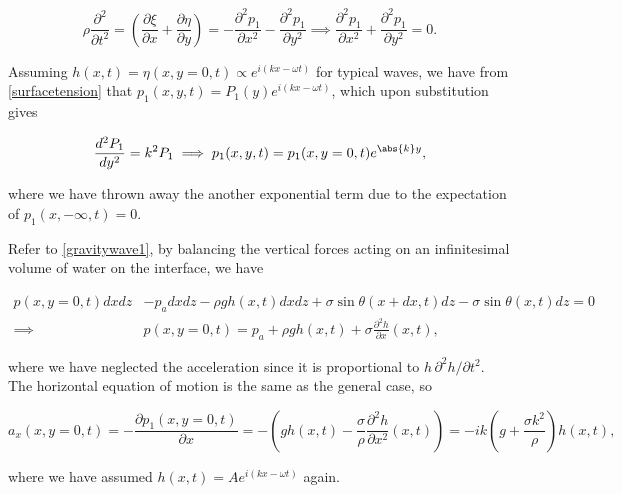 \documentclass[a4paper,12pt]{report}
\begin{document}
\begin{equation}
	\rho \frac{\partial^2 }{\partial t^2} = \left( \frac{\partial \xi }{\partial x} + \frac{\partial \eta }{\partial y}  \right) = - \frac{\partial^2 p_1 }{\partial x^2} - \frac{\partial^2 p_1 }{\partial y^2} \implies \frac{\partial^2 p_{1} }{\partial x^2} + \frac{\partial^2 p_1 }{\partial y^2} = 0.   
\end{equation}

Assuming \(h(x,t) = \eta (x,y=0,t) \propto e^{i(kx-\omega t)} \) for typical waves, we have from \cref{surfacetension} that \(p_1 (x,y,t) = P_1 (y) e^{i(kx- \omega t)} \), which upon substitution gives

\begin{equation}
	\frac{d^2P_1 }{dy^2} = k^2P_1 \implies p_1 (x,y,t) = p_1 (x,y=0,t)e^{\abs{k} y},  
\end{equation}

where we have thrown away the another exponential term due to the expectation of \(p_1 (x,-\infty,t) = 0\). 



Refer to \cref{gravitywave1}, by balancing the vertical forces acting on an infinitesimal volume of water on the interface, we have


\begin{equation} \label{surfacetension} 
	\begin{aligned} 
	p(x,y=0,t) dxdz &- p_{a} dxdz - \rho g h(x,t) dxdz + \sigma \sin \theta (x+dx,t)dz - \sigma \sin \theta (x,t)dz = 0 \\
	\implies &p(x,y=0,t) = p_{a} + \rho g h(x,t) + \sigma \frac{\partial^2 h}{\partial x} (x,t),
	\end{aligned} 
\end{equation}

where we have neglected the acceleration since it is proportional to \(h\,\partial ^2h/\partial t^2\). The horizontal equation of motion is the same as the general case, so

\begin{equation}
	a_{x}(x,y=0,t) = -\frac{\partial p_1 (x,y=0,t)}{\partial x} =- \left( gh(x,t) - \frac{\sigma }{\rho } \frac{\partial^2 h}{\partial x^2}(x,t)  \right) = -ik\left( g+\frac{\sigma k^2}{\rho }  \right) h(x,t),  
\end{equation}

where we have assumed \(h(x,t) = A e^{i(kx - \omega t)} \) again.
\end{document}
